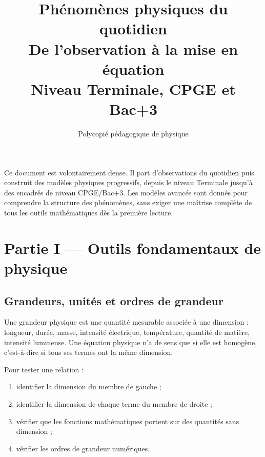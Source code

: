 \documentclass[11pt,a4paper]{article}
\title{\Huge\textbf{Phénomènes physiques du quotidien}\\[2mm]
\Large De l'observation à la mise en équation\\[1mm]
\large Niveau Terminale, CPGE et Bac+3}
\author{Polycopié pédagogique de physique}
\date{}
\begin{document}
\maketitle

\begin{attentionbox}
Ce document est volontairement dense. Il part d'observations du quotidien puis construit des modèles physiques progressifs, depuis le niveau Terminale jusqu'à des encadrés de niveau CPGE/Bac+3. Les modèles avancés sont donnés pour comprendre la structure des phénomènes, sans exiger une maîtrise complète de tous les outils mathématiques dès la première lecture.
\end{attentionbox}

\tableofcontents
\newpage


\section{Partie I — Outils fondamentaux de physique}

\subsection{Grandeurs, unités et ordres de grandeur}

\begin{definitionbox}
Une grandeur physique est une quantité mesurable associée à une dimension : longueur, durée, masse, intensité électrique, température, quantité de matière, intensité lumineuse. Une équation physique n'a de sens que si elle est homogène, c'est-à-dire si tous ses termes ont la même dimension.
\end{definitionbox}

\begin{methodebox}
Pour tester une relation :
\begin{enumerate}
  \item identifier la dimension du membre de gauche ;
  \item identifier la dimension de chaque terme du membre de droite ;
  \item vérifier que les fonctions mathématiques portent sur des quantités sans dimension ;
  \item vérifier les ordres de grandeur numériques.
\end{enumerate}
\end{methodebox}
\end{document}
